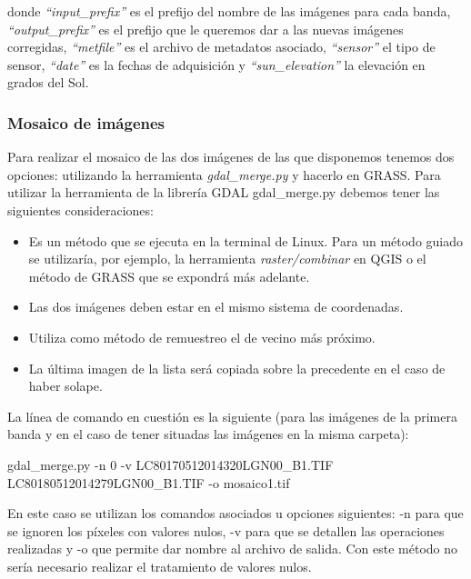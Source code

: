 donde \textit{``input\_prefix''} es el prefijo del nombre de las imágenes para cada banda, \textit{``output\_prefix''} es el prefijo que le queremos dar a las nuevas imágenes corregidas, \textit{``metfile''} es el archivo de metadatos asociado, \textit{``sensor''} el tipo de sensor, \textit{``date''} es la fechas de adquisición y \textit{``sun\_elevation''} la elevación en grados del Sol.

\subsubsection{Mosaico de imágenes}
Para realizar el mosaico de las dos imágenes de las que disponemos tenemos dos opciones: utilizando la herramienta \textit{gdal\_merge.py} y hacerlo en GRASS. Para utilizar la herramienta de la librería \ac{GDAL} gdal\_merge.py debemos tener las siguientes consideraciones:

\begin{itemize}
	\item Es un método que se ejecuta en la terminal de Linux. Para un método guiado se utilizaría, por ejemplo, la herramienta \textit{raster/combinar} en QGIS o el método de GRASS que se expondrá más adelante.
	\item Las dos imágenes deben estar en el mismo sistema de coordenadas.
	\item Utiliza como método de remuestreo el de vecino más próximo.
	\item La última imagen de la lista será copiada sobre la precedente en el caso de haber solape.
\end{itemize}

La línea de comando en cuestión es la siguiente (para las imágenes de la primera banda y en el caso de tener situadas las imágenes en la misma carpeta):

\begin{center}
\begin{boxedverbatim}
	gdal_merge.py -n 0 -v LC80170512014320LGN00_B1.TIF 
	LC80180512014279LGN00_B1.TIF -o mosaico1.tif
\end{boxedverbatim}
\end{center}

En este caso se utilizan los comandos asociados u opciones siguientes: -n para que se ignoren los píxeles con valores nulos, -v para que se detallen las operaciones realizadas y -o que permite dar nombre al archivo de salida. Con este método no sería necesario realizar el tratamiento de valores nulos.\Sep

